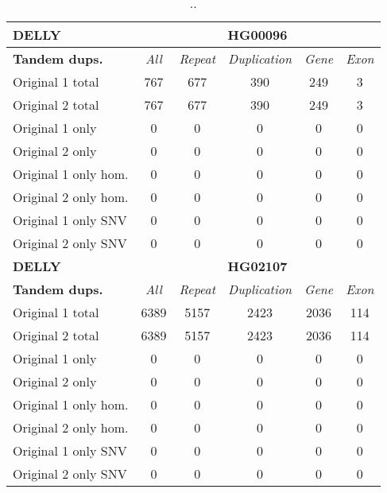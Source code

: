 \begin{table}[htb]
\begin{center}
\begin{tabular}{|l|c||c|c|c|c|}
\hline
{\bf DELLY} & \multicolumn{5}{|c|}{\bf HG00096} \\
\hline
\cline{2-6}
{\bf Tandem dups.} & {\it All} & {\it Repeat} & {\it Duplication} & {\it Gene} & {\it Exon} \\
\hline
Original 1 total & 767 & 677 & 390 & 249 & 3\\ 
\hline
Original 2 total & 767 & 677 & 390 & 249 & 3\\ 
\hline
Original 1 only & 0 & 0 & 0 & 0 & 0\\ 
\hline
Original 2 only & 0 & 0 & 0 & 0 & 0\\ 
\hline
Original 1 only hom. & 0 & 0 & 0 & 0 & 0\\ 
\hline
Original 2 only hom. & 0 & 0 & 0 & 0 & 0\\ 
\hline
Original 1 only SNV & 0 & 0 & 0 & 0 & 0\\ 
\hline
Original 2 only SNV & 0 & 0 & 0 & 0 & 0\\ 
\hline
\hline
{\bf DELLY} & \multicolumn{5}{|c|}{\bf HG02107} \\
\hline
\cline{2-6}
{\bf Tandem dups.} & {\it All} & {\it Repeat} & {\it Duplication} & {\it Gene} & {\it Exon} \\
\hline
Original 1 total & 6389 & 5157 & 2423 & 2036 & 114\\ 
\hline
Original 2 total & 6389 & 5157 & 2423 & 2036 & 114\\ 
\hline
Original 1 only & 0 & 0 & 0 & 0 & 0\\ 
\hline
Original 2 only & 0 & 0 & 0 & 0 & 0\\ 
\hline
Original 1 only hom. & 0 & 0 & 0 & 0 & 0\\ 
\hline
Original 2 only hom. & 0 & 0 & 0 & 0 & 0\\ 
\hline
Original 1 only SNV & 0 & 0 & 0 & 0 & 0\\ 
\hline
Original 2 only SNV & 0 & 0 & 0 & 0 & 0\\ 
\hline
\end{tabular}
\end{center}
\caption{ .. }
\label{tab:orig-vs-orig2-delly-dups}
\end{table}

